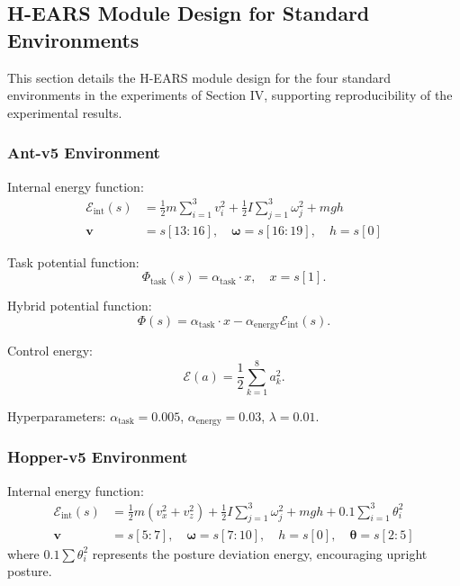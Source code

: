 \documentclass[journal]{IEEEtran}
\begin{document}
	\subsection{H-EARS Module Design for Standard Environments}
	\label{app:standard_envs}
	
	This section details the H-EARS module design for the four standard environments in the experiments of Section IV, supporting reproducibility of the experimental results.
	
	\subsubsection{Ant-v5 Environment}
	
	Internal energy function:
	\begin{equation}
		\begin{aligned}
			\mathcal{E}_{\text{int}}(s) &= \frac{1}{2}m\sum_{i=1}^{3}v_i^2 + \frac{1}{2}I\sum_{j=1}^{3}\omega_j^2 + mgh \\
			\mathbf{v} &= s[13:16], \quad \boldsymbol{\omega} = s[16:19], \quad h = s[0]
		\end{aligned}
	\end{equation}
	
	Task potential function:
	\begin{equation}
		\Phi_{\text{task}}(s) = \alpha_{\text{task}} \cdot x, \quad x = s[1].
	\end{equation}
	
	Hybrid potential function:
	\begin{equation}
		\Phi(s) = \alpha_{\text{task}} \cdot x - \alpha_{\text{energy}}\mathcal{E}_{\text{int}}(s).
	\end{equation}
	
	Control energy:
	\begin{equation}
		\mathcal{E}(a) = \frac{1}{2}\sum_{k=1}^{8}a_k^2.
	\end{equation}
	
	Hyperparameters: $\alpha_{\text{task}}=0.005$, $\alpha_{\text{energy}}=0.03$, $\lambda=0.01$.
	
	\subsubsection{Hopper-v5 Environment}
	
	Internal energy function:
	\begin{equation}
		\begin{aligned}
			\mathcal{E}_{\text{int}}(s) &= \frac{1}{2}m(v_x^2 + v_z^2) + \frac{1}{2}I\sum_{j=1}^{3}\omega_j^2 + mgh + 0.1\sum_{i=1}^{3}\theta_i^2 \\
			\mathbf{v} &= s[5:7], \quad \boldsymbol{\omega} = s[7:10], \quad h = s[0], \quad \boldsymbol{\theta} = s[2:5]
		\end{aligned}
	\end{equation}
	where $0.1\sum\theta_i^2$ represents the posture deviation energy, encouraging upright posture.
	
\end{document}
